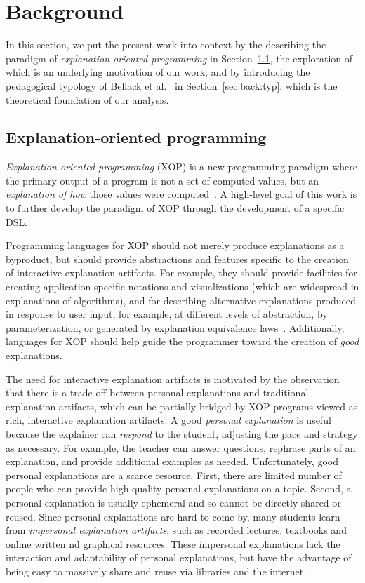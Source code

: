 \documentclass[conference]{IEEEtran}
\begin{document}
\section{Background}
\label{sec:back}

In this section, we put the present work into context by the describing the
paradigm of \emph{explanation-oriented programming} in
Section~\ref{sec:back:xop}, the exploration of which is an underlying
motivation of our work, and by introducing the pedagogical typology of Bellack
et al.~\cite{bellack1966language} in Section~\ref{sec:back:typ}, which is the
theoretical foundation of our analysis.


\subsection{Explanation-oriented programming}
\label{sec:back:xop}

\emph{Explanation-oriented programming} (XOP) is a new programming paradigm
where the primary output of a program is not a set of computed values, but an
\emph{explanation of how} those values were
computed~\cite{EW08vl,EW09dsl,EW09vl,WE11dsl,EW13jvlc}.
%
A high-level goal of this work is to further develop the paradigm of XOP
through the development of a specific DSL.


Programming languages for XOP should not merely produce explanations as a
byproduct, but should provide abstractions and features specific to the
creation of interactive explanation artifacts. For example, they should provide
facilities for creating application-specific notations and visualizations
(which are widespread in explanations of algorithms), and for describing
alternative explanations produced in response to user input, for example, at
different levels of abstraction, by parameterization, or generated by
explanation equivalence laws~\cite{EW13jvlc}. Additionally, languages for XOP
should help guide the programmer toward the creation of \emph{good}
explanations.


The need for interactive explanation artifacts is motivated by the observation
that there is a trade-off between personal explanations and traditional
explanation artifacts, which can be partially bridged by XOP programs viewed as
rich, interactive explanation artifacts.
%
A good \emph{personal explanation} is useful because the explainer can
\emph{respond} to the student, adjusting the pace and strategy as necessary.
For example, the teacher can answer questions, rephrase parts of an
explanation, and provide additional examples as needed.
%
Unfortunately, good personal explanations are a scarce resource. First, there
are limited number of people who can provide high quality personal explanations
on a topic. Second, a personal explanation is usually ephemeral and so cannot
be directly shared or reused.
%
Since personal explanations are hard to come by, many students learn from
\emph{impersonal explanation artifacts}, such as recorded lectures, textbooks
and online written nd graphical resources.
%
These impersonal explanations lack the interaction and adaptability of personal
explanations, but have the advantage of being easy to massively share and reuse
via libraries and the internet.
\end{document}
